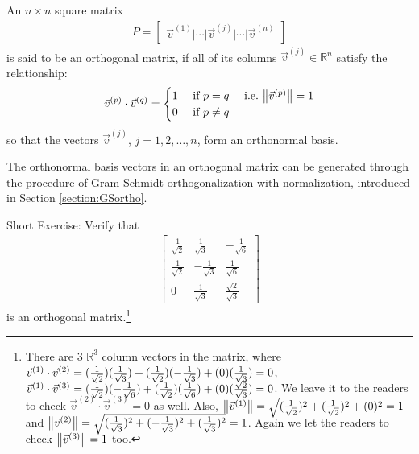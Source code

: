 \begin{defn}
\label{defn:orthomatrix}
An $n \times n$ square matrix
\begin{align*}
P = \begin{bmatrix}
\vec{v}^{(1)}|\cdots|\vec{v}^{(j)}|\cdots|\vec{v}^{(n)}   
\end{bmatrix}
\end{align*}
is said to be an orthogonal matrix, if all of its columns $\vec{v}^{(j)} \in \mathbb{R}^n$ satisfy the relationship:
\begin{align}
\vec{v}^{(p)} \cdot \vec{v}^{(q)} =
\begin{cases}
1 &\text{ if } p = q \quad \text{ i.e.\ } \norm{\vec{v}^{(p)}} = 1 \\
0 &\text{ if } p \neq q    
\end{cases}
\end{align}
so that the vectors $\vec{v}^{(j)}$, $j=1,2,\ldots,n$, form an orthonormal basis.
\end{defn}
The orthonormal basis vectors in an orthogonal matrix can be generated through the procedure of Gram-Schmidt orthogonalization with normalization, introduced in Section \ref{section:GSortho}.\par
Short Exercise: Verify that 
\begin{align*}
\begin{bmatrix}
\frac{1}{\sqrt{2}} & \frac{1}{\sqrt{3}} & -\frac{1}{\sqrt{6}} \\
\frac{1}{\sqrt{2}} & -\frac{1}{\sqrt{3}} & \frac{1}{\sqrt{6}} \\
0 & \frac{1}{\sqrt{3}} & \frac{\sqrt{2}}{\sqrt{3}}
\end{bmatrix}
\end{align*}
is an orthogonal matrix.\footnote{There are $3$ $\mathbb{R}^3$ column vectors in the matrix, where $\vec{v}^{(1)} \cdot \vec{v}^{(2)} = \smash{(\frac{1}{\sqrt{2}})(\frac{1}{\sqrt{3}})} + \smash{(\frac{1}{\sqrt{2}})(-\frac{1}{\sqrt{3}})} + \smash{(0)(\frac{1}{\sqrt{3}})} = 0$, $\vec{v}^{(1)} \cdot \vec{v}^{(3)} = \smash{(\frac{1}{\sqrt{2}})(-\frac{1}{\sqrt{6}})} + \smash{(\frac{1}{\sqrt{2}})(\frac{1}{\sqrt{6}})} + \smash{(0)(\frac{\sqrt{2}}{\sqrt{3}})} = 0$. We leave it to the readers to check $\vec{v}^{(2)} \cdot \vec{v}^{(3)} = 0$ as well. Also, $\norm{\vec{v}^{(1)}} = \smash{\sqrt{(\frac{1}{\sqrt{2}})^2 + (\frac{1}{\sqrt{2}})^2 + (0)^2}} = 1$ and $\norm{\vec{v}^{(2)}} = \smash{\sqrt{(\frac{1}{\sqrt{3}})^2 + (-\frac{1}{\sqrt{3}})^2 + (\frac{1}{\sqrt{3}})^2}} = 1$. Again we let the readers to check $\norm{\vec{v}^{(3)}} = 1$ too.}\par
